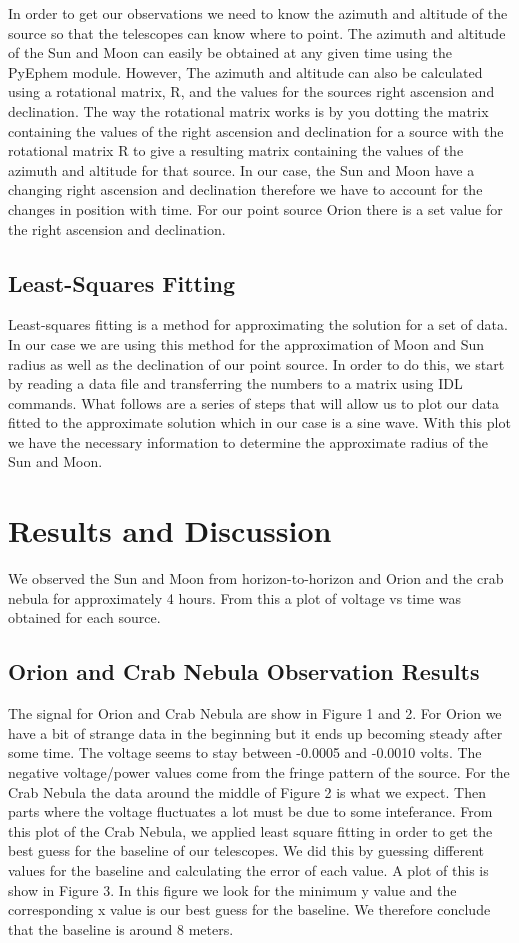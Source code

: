 \documentclass[12pt]{article}
\begin{document}
In order to get our observations we need to know the azimuth and
altitude of the source so that the telescopes can know where to
point. The azimuth and altitude of the Sun and Moon can easily be
obtained at any given time using the PyEphem module. However, The
azimuth and altitude can also be calculated using a rotational matrix,
R, and the values for the sources right ascension and declination. The
way the rotational matrix works is by you dotting the matrix containing
the values of the right ascension and declination for a source with the
rotational matrix R to give a resulting matrix containing the values of
the azimuth and altitude for that source. In our case, the Sun and Moon
have a changing right ascension and declination therefore we have to
account for the changes in position with time. For our point source
Orion there is a set value for the right ascension and declination. 

\subsection {Least-Squares Fitting}

Least-squares fitting is a method for approximating the solution for a
set of data. In our case we are using this method for the approximation
of Moon and Sun radius as well as the declination of our point
source. In order to do this, we start by reading a data file and
transferring the numbers to a matrix using IDL commands. What follows
are a series of steps that will allow us to plot our data fitted to the
approximate solution which in our case is a sine wave. With this plot we
have the necessary information to determine the approximate radius of
the Sun and Moon.

\section {Results and Discussion}

We observed the Sun and Moon from horizon-to-horizon and Orion and the
crab nebula for approximately 4 hours. From this a plot of voltage vs
time was obtained for each source.
\subsection {Orion and Crab Nebula Observation Results}
The signal for Orion and Crab Nebula are show in Figure 1 and 2. For
Orion we have a bit of strange data in the beginning but it ends up
becoming steady after some time. The voltage seems to stay between
-0.0005 and -0.0010 volts. The negative voltage/power values come from
the fringe pattern of the source. For the Crab Nebula the data around
the middle of Figure 2 is what we expect. Then parts where the voltage
fluctuates a lot must be due to some inteferance. From this plot of the
Crab Nebula, we applied least square fitting in order to get the best
guess for the baseline of our telescopes. We did this by guessing
different values for the baseline and calculating the error of each
value. A plot of this is show in Figure 3. In this figure we look for the
minimum y value and the corresponding x value is our best guess for the
baseline. We therefore conclude that the baseline is around 8 meters.
\end{document}
